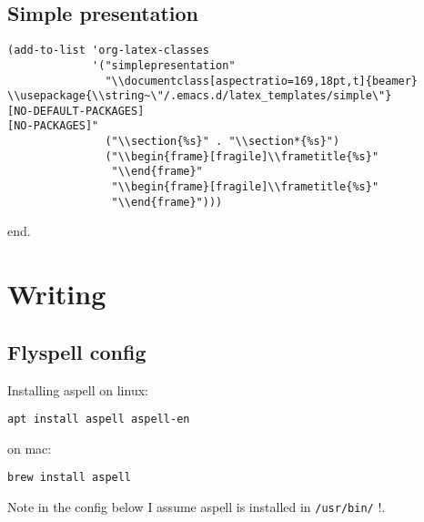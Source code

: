 \documentclass[12pt]{article}
\begin{document}
\subsection{Simple presentation}
\label{sec-5-15}

\lstset{language=Lisp,label= ,caption= ,numbers=none}
\begin{lstlisting}
(add-to-list 'org-latex-classes
             '("simplepresentation"
               "\\documentclass[aspectratio=169,18pt,t]{beamer}
\\usepackage{\\string~\"/.emacs.d/latex_templates/simple\"}
[NO-DEFAULT-PACKAGES]
[NO-PACKAGES]"
               ("\\section{%s}" . "\\section*{%s}")
               ("\\begin{frame}[fragile]\\frametitle{%s}"
                "\\end{frame}"
                "\\begin{frame}[fragile]\\frametitle{%s}"
                "\\end{frame}")))
\end{lstlisting}

end. 

\section{Writing}
\label{sec-6}

\subsection{Flyspell config}
\label{sec-6-1}

Installing aspell on linux:

\begin{verbatim}
apt install aspell aspell-en
\end{verbatim}

on mac: 

\begin{verbatim}
brew install aspell
\end{verbatim}

Note in the config below I assume aspell is installed in \texttt{/usr/bin/} !. 
\end{document}

